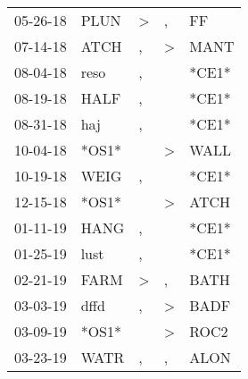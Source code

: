 \begin{supertabular}{p{0.07\textwidth}p{0.06\textwidth}p{0.02\textwidth}p{0.02\textwidth}p{0.06\textwidth}}
          05-26-18\textsuperscript{} &           PLUN\textsuperscript{} &     \textgreater &                , &             FF\textsuperscript{} \\
          07-14-18\textsuperscript{} &           ATCH\textsuperscript{} &                , &     \textgreater &           MANT\textsuperscript{} \\
          08-04-18\textsuperscript{} &           reso\textsuperscript{} &                , &                  &                            *CE1* \\
          08-19-18\textsuperscript{} &           HALF\textsuperscript{} &                , &                  &                            *CE1* \\
          08-31-18\textsuperscript{} &            haj\textsuperscript{} &                , &                  &                            *CE1* \\
          10-04-18\textsuperscript{} &                            *OS1* &                  &     \textgreater &           WALL\textsuperscript{} \\
          10-19-18\textsuperscript{} &           WEIG\textsuperscript{} &                , &                  &                            *CE1* \\
          12-15-18\textsuperscript{} &                            *OS1* &                  &     \textgreater &           ATCH\textsuperscript{} \\
          01-11-19\textsuperscript{} &           HANG\textsuperscript{} &                , &                  &                            *CE1* \\
          01-25-19\textsuperscript{} &           lust\textsuperscript{} &                , &                  &                            *CE1* \\
          02-21-19\textsuperscript{} &           FARM\textsuperscript{} &     \textgreater &                , &           BATH\textsuperscript{} \\
          03-03-19\textsuperscript{} &           dffd\textsuperscript{} &                , &     \textgreater &           BADF\textsuperscript{} \\
          03-09-19\textsuperscript{} &                            *OS1* &                  &     \textgreater &           ROC2\textsuperscript{} \\
          03-23-19\textsuperscript{} &           WATR\textsuperscript{} &                , &                , &           ALON\textsuperscript{} \\

\end{supertabular}
